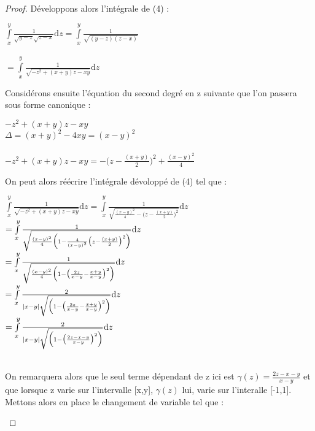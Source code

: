 \documentclass[french]{article}
\begin{document}
\begin{proof}
Développons alors l'intégrale de (4) :
\begin{center}
    $\int\limits_{x}^{y}\frac{1}{\sqrt{y-z}\sqrt{z-x}}\mathrm{d}z=\int\limits_{x}^{y}\frac{1}{\sqrt{(y-z)(z-x)}}$\\
    \ \\
    \hspace{3,3cm}$=\int\limits_{x}^{y}\frac{1}{\sqrt{-z^2+(x+y)z-xy}}\mathrm{d}z$
\end{center}
Considérons ensuite l'équation du second degré en z suivante que l'on passera sous forme canonique :
\begin{center}
    $-z^2+(x+y)z-xy$\\
    $\Delta=(x+y)^2-4xy=(x-y)^2$\\
    \ \\
    $-z^2+(x+y)z-xy=-\bigl(z-\frac{(x+y)}{2}\bigr)^2+\frac{(x-y)^2}{4}$
\end{center}
\newpage
On peut alors réécrire l'intégrale dévoloppé de (4) tel que :
\begin{center}
    $\int\limits_{x}^{y}\frac{1}{\sqrt{-z^2+(x+y)z-xy}}\mathrm{d}z=\int\limits_{x}^{y}\frac{1}{\sqrt{\frac{(x-y)^2}{4}-\bigl(z-\frac{(x+y)}{2}\bigr)^2}}\mathrm{d}z$\\
    \hspace{4.5cm}$=\int\limits_{x}^{y}\frac{1}{\sqrt{\frac{(x-y)^2}{4}\Bigl(1-\frac{4}{(x-y)^2}\bigl(z-\frac{(x+y)}{2}\bigr)^2\Bigr)}}\mathrm{d}z$\\
    \hspace{4cm}$=\int\limits_{x}^{y}\frac{1}{\sqrt{\frac{(x-y)^2}{4}\Bigl(1-\bigl(\frac{2z}{x-y}-\frac{x+y}{x-y}\bigr)^2\Bigr)}}\mathrm{d}z$\\
    \hspace{3.8cm}$=\int\limits_{x}^{y}\frac{2}{\mid x-y\mid\sqrt{\Bigl(1-\bigl(\frac{2z}{x-y}-\frac{x+y}{x-y}\bigr)^2\Bigr)}}\mathrm{d}z$\\
    \hspace{3.6cm}$=\int\limits_{x}^{y}\frac{2}{\mid x-y\mid\sqrt{\Bigl(1-\bigl(\frac{2z-x-y}{x-y}\bigr)^2\Bigr)}}\mathrm{d}z$\\
\end{center}
\ \\
On remarquera alors que le seul terme dépendant de z ici est $\gamma(z)=\frac{2z-x-y}{x-y}$ et que lorsque z varie sur l'intervalle [x,y], $\gamma(z)$ lui, varie sur l'interalle [-1,1].\\
Mettons alors en place le changement de variable tel que :
\begin{center}

\end{center}
\end{proof}
\end{document}
